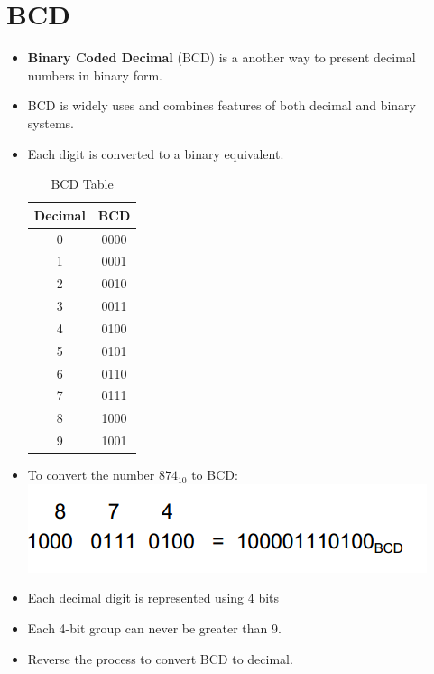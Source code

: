 \documentclass[12pt]{article}
\begin{document}
\section{BCD}
\begin{itemize}
	\item \textbf{Binary Coded Decimal} (BCD) is a another way to present decimal numbers in binary form.
 	\item BCD is widely uses and combines features of both decimal and binary systems.
 	\item Each digit is converted to a binary equivalent.
\begin{table}[h!]
\begin{center}
	\caption{BCD Table}
	\begin{tabular}{|c|c|}
	\hline
	\textbf{Decimal} & \textbf{BCD} \\
	\hline
	0 & 0000\\
	\hline
	1 & 0001\\
	\hline
	2 & 0010\\
	\hline
	3 & 0011\\
	\hline
	4 & 0100\\
	\hline
	5 & 0101\\
	\hline
	6 & 0110\\
	\hline
	7 & 0111\\
	\hline
	8 & 1000\\
	\hline
	9 & 1001\\
	\hline
	\end{tabular}
\end{center}
\end{table}
	\item To convert the number $874_{10}$ to BCD: \\
	\includegraphics{hinh5}
	\item Each decimal digit is represented using 4 bits
	\item Each 4-bit group can never be greater than 9.
	\item Reverse the process to convert BCD to decimal.
\end{itemize}
\end{document}

